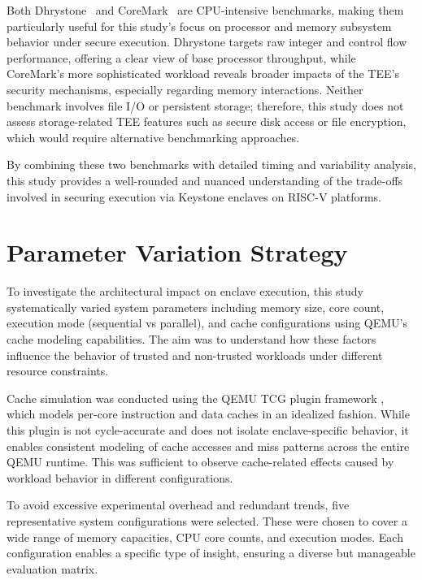 Both Dhrystone~\cite{weiss2002dhrystone} and CoreMark~\cite{gal2012exploring} are CPU-intensive benchmarks, making them particularly useful for this study’s focus on processor and memory subsystem behavior under secure execution. Dhrystone targets raw integer and control flow performance, offering a clear view of base processor throughput, while CoreMark’s more sophisticated workload reveals broader impacts of the TEE’s security mechanisms, especially regarding memory interactions. Neither benchmark involves file I/O or persistent storage; therefore, this study does not assess storage-related TEE features such as secure disk access or file encryption, which would require alternative benchmarking approaches.

By combining these two benchmarks with detailed timing and variability analysis, this study provides a well-rounded and nuanced understanding of the trade-offs involved in securing execution via Keystone enclaves on RISC-V platforms.

\section{Parameter Variation Strategy}
\label{sec:param-variation}

To investigate the architectural impact on enclave execution, this study systematically varied system parameters including memory size, core count, execution mode (sequential vs parallel), and cache configurations using QEMU’s cache modeling capabilities. The aim was to understand how these factors influence the behavior of trusted and non-trusted workloads under different resource constraints.

Cache simulation was conducted using the QEMU TCG plugin framework \cite{mandour2021cache}, which models per-core instruction and data caches in an idealized fashion. While this plugin is not cycle-accurate and does not isolate enclave-specific behavior, it enables consistent modeling of cache accesses and miss patterns across the entire QEMU runtime. This was sufficient to observe cache-related effects caused by workload behavior in different configurations.

To avoid excessive experimental overhead and redundant trends, five representative system configurations were selected. These were chosen to cover a wide range of memory capacities, CPU core counts, and execution modes. Each configuration enables a specific type of insight, ensuring a diverse but manageable evaluation matrix.

